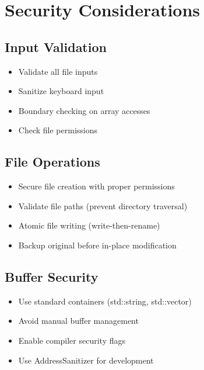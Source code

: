 \documentclass[12pt,a4paper,oneside,openany]{report}
\begin{document}
\chapter{Security Considerations}

\section{Input Validation}

\begin{itemize}
	\item Validate all file inputs
	\item Sanitize keyboard input
	\item Boundary checking on array accesses
	\item Check file permissions
\end{itemize}

\section{File Operations}

\begin{itemize}
	\item Secure file creation with proper permissions
	\item Validate file paths (prevent directory traversal)
	\item Atomic file writing (write-then-rename)
	\item Backup original before in-place modification
\end{itemize}

\section{Buffer Security}

\begin{itemize}
	\item Use standard containers (std::string, std::vector)
	\item Avoid manual buffer management
	\item Enable compiler security flags
	\item Use AddressSanitizer for development
\end{itemize}

\end{document}

